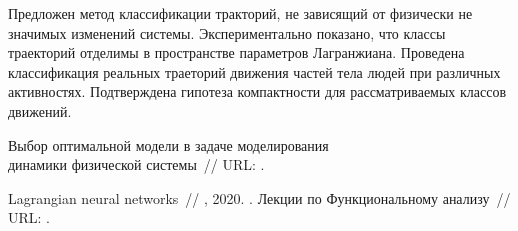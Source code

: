 \documentclass[12pt, twoside]{article}
\begin{document}
Предложен метод классификации тракторий, не зависящий от физически не значимых изменений системы. Экспериментально показано, что классы траекторий отделимы в пространстве параметров Лагранжиана. Проведена классификация реальных траеторий движения частей тела людей при различных активностях. Подтверждена гипотеза компактности для рассматриваемых классов движений.


\begin{thebibliography}{99}

	Выбор оптимальной модели в задаче моделирования\\
        динамики физической системы~//
	URL: .

    Lagrangian neural networks~//
    , 2020.
	.
    Лекции по Функциональному анализу~//
    URL: .
\end{thebibliography}



\end{document}

